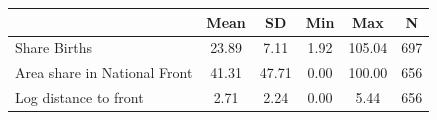 {
\def\sym#1{\ifmmode^{#1}\else\(^{#1}\)\fi}
\begin{tabular}{l*{1}{ccccc}}
\toprule
                    &        Mean&          SD&         Min&         Max&           N\\
\midrule
Share Births        &       23.89&        7.11&        1.92&      105.04&         697\\
Area share in National Front&       41.31&       47.71&        0.00&      100.00&         656\\
Log distance to front&        2.71&        2.24&        0.00&        5.44&         656\\
\bottomrule
\end{tabular}
}
